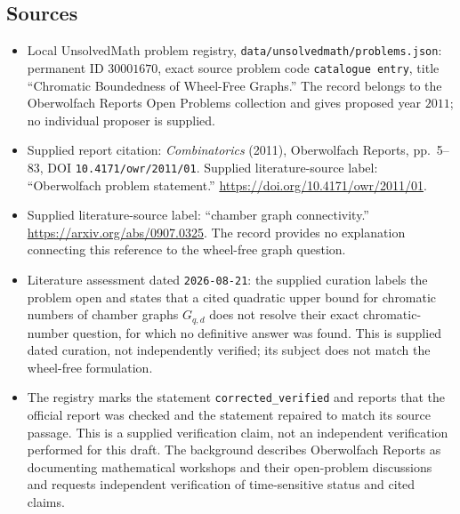 \documentclass[11pt]{article}
\begin{document}
\subsection{Sources}
\begin{itemize}
\item Local UnsolvedMath problem registry, \texttt{data/unsolvedmath/problems.json}: permanent ID \(30001670\), exact source problem code \texttt{catalogue entry}, title ``Chromatic Boundedness of Wheel-Free Graphs.'' The record belongs to the Oberwolfach Reports Open Problems collection and gives proposed year \(2011\); no individual proposer is supplied.
\item Supplied report citation: \emph{Combinatorics} (2011), Oberwolfach Reports, pp.\ 5--83, DOI \texttt{10.4171/owr/2011/01}. Supplied literature-source label: ``Oberwolfach problem statement.'' \url{https://doi.org/10.4171/owr/2011/01}.
\item Supplied literature-source label: ``chamber graph connectivity.'' \url{https://arxiv.org/abs/0907.0325}. The record provides no explanation connecting this reference to the wheel-free graph question.
\item Literature assessment dated \texttt{2026-08-21}: the supplied curation labels the problem open and states that a cited quadratic upper bound for chromatic numbers of chamber graphs \(G_{q,d}\) does not resolve their exact chromatic-number question, for which no definitive answer was found. This is supplied dated curation, not independently verified; its subject does not match the wheel-free formulation.
\item The registry marks the statement \texttt{corrected\_verified} and reports that the official report was checked and the statement repaired to match its source passage. This is a supplied verification claim, not an independent verification performed for this draft. The background describes Oberwolfach Reports as documenting mathematical workshops and their open-problem discussions and requests independent verification of time-sensitive status and cited claims.
\end{itemize}
\end{document}
